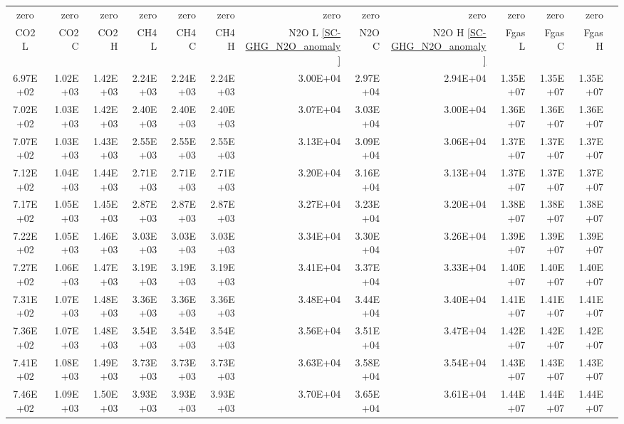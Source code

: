 \documentclass{article}
\begin{document}
\begin{table}
\begin{tabular}{crrr|rrr|rrr|rrr}
zero       & zero       & zero       & zero       & zero       & zero       & zero       & zero       & zero       & zero       & zero       & zero       \\
CO2 L      & CO2 C      & CO2 H      & CH4 L      & CH4 C      & CH4 H      & N2O L \ref{SC-GHG_N2O_anomaly}     & N2O C      & N2O H \ref{SC-GHG_N2O_anomaly}      & Fgas L     & Fgas C     & Fgas H     \\
6.97E+02   & 1.02E+03   & 1.42E+03   & 2.24E+03   & 2.24E+03   & 2.24E+03   & 3.00E+04   & 2.97E+04   & 2.94E+04   & 1.35E+07   & 1.35E+07   & 1.35E+07   \\
7.02E+02   & 1.03E+03   & 1.42E+03   & 2.40E+03   & 2.40E+03   & 2.40E+03   & 3.07E+04   & 3.03E+04   & 3.00E+04   & 1.36E+07   & 1.36E+07   & 1.36E+07   \\
7.07E+02   & 1.03E+03   & 1.43E+03   & 2.55E+03   & 2.55E+03   & 2.55E+03   & 3.13E+04   & 3.09E+04   & 3.06E+04   & 1.37E+07   & 1.37E+07   & 1.37E+07   \\
7.12E+02   & 1.04E+03   & 1.44E+03   & 2.71E+03   & 2.71E+03   & 2.71E+03   & 3.20E+04   & 3.16E+04   & 3.13E+04   & 1.37E+07   & 1.37E+07   & 1.37E+07   \\
7.17E+02   & 1.05E+03   & 1.45E+03   & 2.87E+03   & 2.87E+03   & 2.87E+03   & 3.27E+04   & 3.23E+04   & 3.20E+04   & 1.38E+07   & 1.38E+07   & 1.38E+07   \\
7.22E+02   & 1.05E+03   & 1.46E+03   & 3.03E+03   & 3.03E+03   & 3.03E+03   & 3.34E+04   & 3.30E+04   & 3.26E+04   & 1.39E+07   & 1.39E+07   & 1.39E+07   \\
7.27E+02   & 1.06E+03   & 1.47E+03   & 3.19E+03   & 3.19E+03   & 3.19E+03   & 3.41E+04   & 3.37E+04   & 3.33E+04   & 1.40E+07   & 1.40E+07   & 1.40E+07   \\
7.31E+02   & 1.07E+03   & 1.48E+03   & 3.36E+03   & 3.36E+03   & 3.36E+03   & 3.48E+04   & 3.44E+04   & 3.40E+04   & 1.41E+07   & 1.41E+07   & 1.41E+07   \\
7.36E+02   & 1.07E+03   & 1.48E+03   & 3.54E+03   & 3.54E+03   & 3.54E+03   & 3.56E+04   & 3.51E+04   & 3.47E+04   & 1.42E+07   & 1.42E+07   & 1.42E+07   \\
7.41E+02   & 1.08E+03   & 1.49E+03   & 3.73E+03   & 3.73E+03   & 3.73E+03   & 3.63E+04   & 3.58E+04   & 3.54E+04   & 1.43E+07   & 1.43E+07   & 1.43E+07   \\
7.46E+02   & 1.09E+03   & 1.50E+03   & 3.93E+03   & 3.93E+03   & 3.93E+03   & 3.70E+04   & 3.65E+04   & 3.61E+04   & 1.44E+07   & 1.44E+07   & 1.44E+07   \\

\end{tabular}
\end{table}
\end{document}
